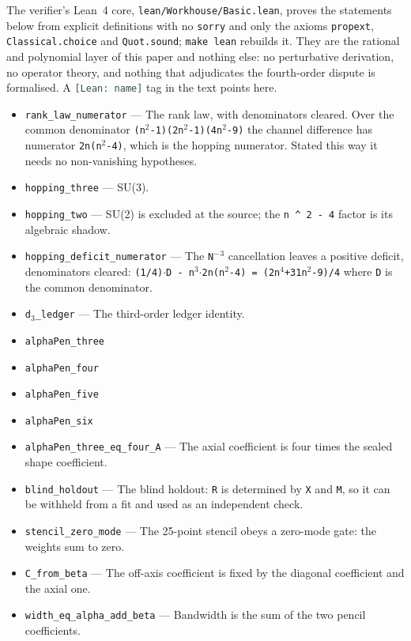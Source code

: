 \documentclass[11pt]{article}
\theoremstyle{plain}
\theoremstyle{definition}
\theoremstyle{remark}
\newcommand{\leanref}[1]{{\footnotesize\textcolor{DarkSlateGray}{\texttt{[Lean: #1]}}}}
\begin{document}
The verifier's Lean~4 core, \texttt{lean/Workhouse/Basic.lean}, proves the
statements below from explicit definitions with no \texttt{sorry} and only the
axioms \texttt{propext}, \texttt{Classical.choice} and \texttt{Quot.sound};
\texttt{make lean} rebuilds it. They are the rational and polynomial layer of
this paper and nothing else: no perturbative derivation, no operator theory,
and nothing that adjudicates the fourth-order dispute is formalised. A
\leanref{name} tag in the text points here.

\begingroup\footnotesize
\begin{itemize}\itemsep0pt
\item \texttt{rank\_law\_numerator} --- The rank law, with denominators cleared. Over the common denominator \texttt{(n$^2$-1)(2n$^2$-1)(4n$^2$-9)} the channel difference has numerator \texttt{2n(n$^2$-4)}, which is the hopping numerator. Stated this way it needs no non-vanishing hypotheses.
\item \texttt{hopping\_three} --- SU(3).
\item \texttt{hopping\_two} --- SU(2) is excluded at the source; the \texttt{n \^{} 2 - 4} factor is its algebraic shadow.
\item \texttt{hopping\_deficit\_numerator} --- The \texttt{N$^-$$^3$} cancellation leaves a positive deficit, denominators cleared: \texttt{(1/4)$\cdot$D - n$^3$$\cdot$2n(n$^2$-4) = (2n$^4$+31n$^2$-9)/4} where \texttt{D} is the common denominator.
\item \texttt{d$_3$\_ledger} --- The third-order ledger identity.
\item \texttt{alphaPen\_three}
\item \texttt{alphaPen\_four}
\item \texttt{alphaPen\_five}
\item \texttt{alphaPen\_six}
\item \texttt{alphaPen\_three\_eq\_four\_A} --- The axial coefficient is four times the sealed shape coefficient.
\item \texttt{blind\_holdout} --- The blind holdout: \texttt{R} is determined by \texttt{X} and \texttt{M}, so it can be withheld from a fit and used as an independent check.
\item \texttt{stencil\_zero\_mode} --- The 25-point stencil obeys a zero-mode gate: the weights sum to zero.
\item \texttt{C\_from\_beta} --- The off-axis coefficient is fixed by the diagonal coefficient and the axial one.
\item \texttt{width\_eq\_alpha\_add\_beta} --- Bandwidth is the sum of the two pencil coefficients.

\end{itemize}
\end{document}
